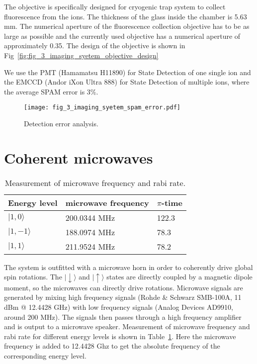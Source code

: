 The objective is specifically designed for cryogenic trap system to collect fluorescence from the ions. The thickness of the glass inside the chamber is 5.63 mm. The numerical aperture of the fluorescence collection objective has to be as large as possible and the currently used objective has a numerical aperture of approximately 0.35. The design of the objective is shown in Fig~\ref{fig:fig_3_imaging_syetem_objective_design}

We use the PMT (Hamamatsu H11890) for State Detection of one single ion and the EMCCD (Andor iXon Ultra 888) for State Detection of multiple ions, where the average SPAM error is 3\%.

\begin{figure}
    \centering
    \texttt{[image: fig\_3\_imaging\_syetem\_spam\_error.pdf]}
    \caption{Detection error analysis.}
    \label{fig:fig_3_imaging_syetem_spam_error}
\end{figure}




\section {Coherent microwaves}

\begin{table}
    \centering
    \caption{Measurement of microwave frequency and rabi rate.}
    \begin{tabular}{lll}
        \toprule
        Energy level   & microwave frequency & $\pi$-time \\
        \midrule
        $|1,0\rangle$  & 200.0344 MHz        & 122.3      \\
        $|1,-1\rangle$ & 188.0974 MHz        & 78.3       \\
        $|1,1\rangle$  & 211.9524 MHz        & 78.2       \\
        \bottomrule
    \end{tabular}
    \label{tab:microwave}
\end{table}

The system is outfitted with a microwave horn in order to coherently drive global spin rotations.
The $|\downarrow\rangle$ and $|\uparrow\rangle$ states are directly coupled by a magnetic dipole moment, so the
microwaves can directly drive rotations. Microwave signals are generated by mixing high frequency signals (Rohde \& Schwarz SMB-100A, 11 dBm @ 12.4428 GHz) with low frequency signals (Analog Devices AD9910, around 200 MHz). The signals then passes through a high frequency amplifier and is output to a microwave speaker. Measurement of microwave frequency and rabi rate for different energy levels is shown in Table~\ref{tab:microwave}. Here the microwave frequency is added to 12.4428 Ghz to get the absolute frequency of the corresponding energy level.
